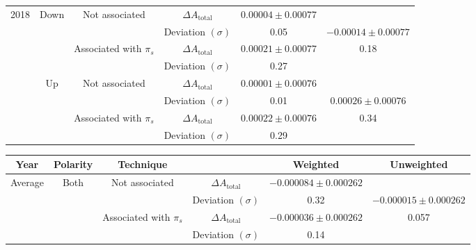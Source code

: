 \documentclass{article}
\begin{document}
\begin{center}
\begin{tabular}{c|c|c|c|c|c}
                        \multirow{8}{*}{2018} & \multirow{4}{*}{Down} & \multirow{2}{*}{Not associated} & $\Delta A_\text{total}$ & $0.00004\pm 0.00077$& \\
                        & & & Deviation $(\sigma)$ & 0.05& $-0.00014\pm 0.00077$\\
                        \cline{3-5}
                        & & \multirow{2}{*}{Associated with $\pi_s$} & $\Delta A_\text{total}$ & $0.00021\pm 0.00077$& 0.18\\
                        & & & Deviation $(\sigma)$ & 0.27& \\
                        \cline{2-6}
                        & \multirow{4}{*}{Up} & \multirow{2}{*}{Not associated} & $\Delta A_\text{total}$ & $0.00001\pm 0.00076$& \\
                        & & & Deviation $(\sigma)$ & 0.01& $0.00026\pm 0.00076$\\
                        \cline{3-5}
                        & & \multirow{2}{*}{Associated with $\pi_s$} & $\Delta A_\text{total}$ & $0.00022\pm 0.00076$& 0.34\\
                        & & & Deviation $(\sigma)$ & 0.29& \\
                        \hline
                \end{tabular}
                \label{tab:all}
        \end{center}

        \begin{table}[htbp]
                \begin{adjustbox}{center}
                        \begin{tabular}{c|c|c|c|c|c}
                                Year & Polarity & Technique & & Weighted & Unweighted\\
                                \hline\hline
                                \multirow{4}{*}{Average} & \multirow{4}{*}{Both} & \multirow{2}{*}{Not associated} & $\Delta A_\text{total}$ & $-0.000084\pm 0.000262$& \\
                                & & & Deviation $(\sigma)$ & 0.32& $-0.000015\pm 0.000262$\\
                                \cline{3-5}
                                & & \multirow{2}{*}{Associated with $\pi_s$} & $\Delta A_\text{total}$ & $-0.000036\pm 0.000262$& 0.057\\
                                & & & Deviation $(\sigma)$ & 0.14& \\
                        \end{tabular}
                \end{adjustbox}
                \label{tab:average}
        \end{table}
\end{document}
